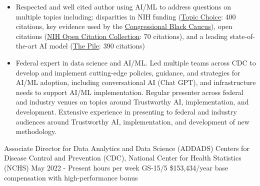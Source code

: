 \documentclass[]{scrartcl}
\begin{document}
\begin{cleanCV}

   \vspace{-1em}

   {
  \vspace{-0.25em}
  \begin{itemize}

      \item Respected and well cited author using AI/ML to address questions on multiple topics including: disparities in NIH funding (\href{https://www.science.org/doi/10.1126/sciadv.aaw7238}{Topic Choice}: 400 citations, key evidence used by the \href{https://bluntrochester.house.gov/uploadedfiles/191220_ltr_to_nih_about_grant_disparities.pdf}{Congressional Black Caucus}), open citations (\href{https://www.ncbi.nlm.nih.gov/pmc/articles/PMC6786512/}{NIH Open Citation Collection}: 70 citations), and a leading state-of-the-art AI model (\href{https://arxiv.org/abs/2101.00027}{The Pile}: 390 citations)

      \item Federal expert in data science and AI/ML. Led multiple teams across CDC to develop and implement cutting-edge policies, guidance, and strategies for AI/ML adoption, including conversational AI (Chat GPT), and infrastructure needs to support AI/ML implementation. Regular presenter across federal and industry venues on topics around Trustworthy AI, implementation, and development. Extensive experience in presenting to federal and industry audiences around Trustworthy AI, implementation, and development of new methodology.

  \end{itemize}
}


  \vspace{-1em}

\WorkExperience
{}
{Associate Director for Data Analytics and Data Science (ADDADS)}
{
  \newline Centers for Disease Control and Prevention (CDC), National Center for Health Statistics (NCHS)
  \newline May 2022 - Present
   hours per week
  \newline GS-15/5 \$153,434/year base compensation with high-performance bonus 
}
{
  \vspace{-0.25em}
  \begin{itemize}


\end{itemize}}
\end{cleanCV}
\end{document}
